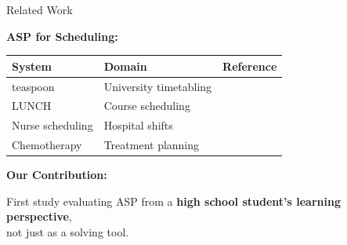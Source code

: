 \documentclass[aspectratio=169]{beamer}
\begin{document}
\begin{frame}{Related Work}

    \textbf{ASP for Scheduling:}

    \vspace{0.5cm}

    \begin{tabular}{lll}
        \toprule
        \textbf{System} & \textbf{Domain} & \textbf{Reference} \\
        \midrule
        teaspoon & University timetabling & \cite{teaspoon:2019} \\
        LUNCH & Course scheduling & \cite{lunch_2023} \\
        Nurse scheduling & Hospital shifts & \cite{Nabeshima_2026} \\
        Chemotherapy & Treatment planning & \cite{DODARO_GALATA_GRIONI_MARATEA_MOCHI_PORRO_2021} \\
        \bottomrule
    \end{tabular}

    \vspace{0.8cm}

    \Large \textbf{Our Contribution:}

    \vspace{0.3cm}

    \normalsize
    First study evaluating ASP from a \textbf{high school student's learning perspective}, \\
    not just as a solving tool.
\end{frame}
\end{document}
